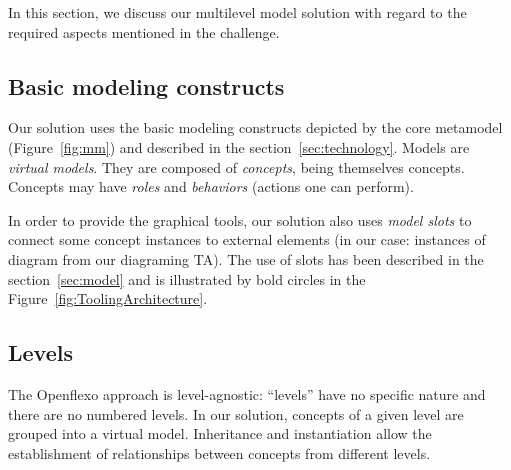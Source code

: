 In this section, we discuss our multilevel model solution with regard to the required aspects
mentioned in the challenge.


  \subsection{Basic modeling constructs}


  Our solution uses the basic modeling constructs depicted by the \FML core
  metamodel (Figure~\ref{fig:mm}) and described in
  the section~\ref{sec:technology}. Models are \emph{virtual models}. They are
  composed of \emph{concepts}, being themselves concepts. Concepts may have
  \emph{roles} and \emph{behaviors} (actions one can perform).

  In order to provide the graphical tools, our solution also uses \emph{model
  slots} to connect some concept instances to external elements (in our case:
  instances of diagram from our diagraming TA). The use of slots has been
  described in the section~\ref{sec:model} and is illustrated by bold circles in
  the Figure~\ref{fig:ToolingArchitecture}.


  \subsection{Levels}


  The Openflexo approach is level-agnostic: ``levels'' have no specific nature
  and there are no numbered levels. In our solution, concepts of a given level
  are grouped into a virtual model. Inheritance and instantiation allow the
  establishment of relationships between concepts from different levels.


